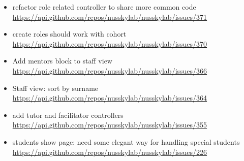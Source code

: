 {\begin{itemize}[noitemsep]
    \item refactor role related controller to share more common code \url{https://api.github.com/repos/nusskylab/nusskylab/issues/371} 
    \item create roles should work with cohort \url{https://api.github.com/repos/nusskylab/nusskylab/issues/370} 
    \item Add mentors block to staff view \url{https://api.github.com/repos/nusskylab/nusskylab/issues/366} 
    \item Staff view: sort by surname \url{https://api.github.com/repos/nusskylab/nusskylab/issues/364} 
    \item add tutor and facilitator controllers \url{https://api.github.com/repos/nusskylab/nusskylab/issues/355} 
    \item students show page: need some elegant way for handling special students \url{https://api.github.com/repos/nusskylab/nusskylab/issues/226} 
\end{itemize}

}
